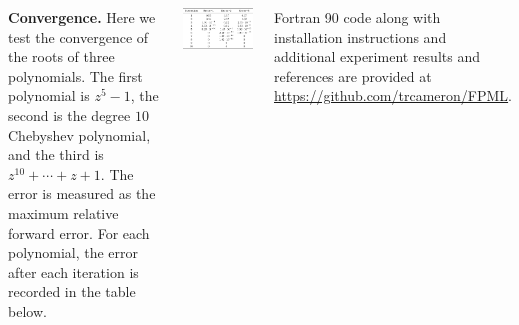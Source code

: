 \documentclass[20 pt, a0paper, portrait]{tikzposter}
\begin{document}
\begin{columns}
{	\textbf{Convergence.} Here we test the convergence of the roots of three polynomials. The first polynomial is $z^{5}-1$, the second is the degree $10$ Chebyshev polynomial, and the third is $z^{10}+\cdots+z+1$. The error is measured as the maximum relative forward error. For each polynomial, the error after each iteration is recorded in the table below.
	\vspace*{-2em}
	\begin{tikzfigure}
	\centering
	\includegraphics[scale=0.60]{../tests/figures/conv.png}
	\end{tikzfigure}
	}
	{
	Fortran 90 code along with installation instructions and additional experiment results and references are provided at \url{https://github.com/trcameron/FPML}.
	\vspace*{-1em}
	
	
	}
 \end{columns}
 
\end{document}
